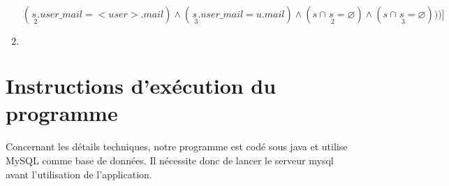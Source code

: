 \documentclass[a4paper,10pt]{article}
\begin{document}
\begin{enumerate}
		\begin{equation}
		( \underset{\ \ 2}{s}.user\_mail = <user>.mail ) \wedge ( \underset{\ \ 3}{s}.user\_mail = u.mail ) \wedge ( s \cap \underset{\ \ 2}{s} = \varnothing ) \wedge ( s \cap \underset{\ \ 3}{s} = \varnothing )))]
		\end{equation} 
	    \item
	         \begin{equation}
		[u.* | \ User(u) \ \wedge \forall \underset{\ \ 2}{u} (User(\underset{\ \ 2}{u}) \rightarrow ( \exists \underset{\ \ 1}{p} \underset{\ \ 2}{p} \underset{\ \ 3}{p} \underset{\ \ 4}{p} \underset{\ \ 5}{p} \underset{\ \ 6}{p} (Proposition(\underset{\ \ 1}{p}) \wedge Proposition(\underset{\ \ 2}{p})  \wedge Proposition(\underset{\ \ 3}{p})
		\end{equation}
		\begin{equation}
                  \wedge Proposition(\underset{\ \ 4}{p}) \wedge Proposition(\underset{\ \ 5}{p}) \wedge Proposition(\underset{\ \ 6}{p}) \wedge \underset{\ \ 1}{p}.stream\_url = <user>.personal\_stream\_url 
		\end{equation}
		\begin{equation}
                   \wedge \underset{\ \ 2}{p}.stream\_url = <user>.personal\_stream\_url \wedge \underset{\ \ 3}{p}.stream\_url = <user>.personal\_stream\_url
		\end{equation}
		\begin{equation}
                   \wedge \underset{\ \ 4}{p}.stream\_url = u.personal\_stream\_url \wedge \underset{\ \ 5}{p}.stream\_url = u.personal\_stream\_url 
		\end{equation}
		\begin{equation}
                   \wedge \underset{\ \ 6}{p}.stream\_url = u.personal\_stream\_url \wedge \underset{\ \ 1}{p}.publication\_url =  \underset{\ \ 4}{p}.publication\_url 
		\end{equation}
		\begin{equation}
		\wedge \underset{\ \ 2}{p}.publication\_url =  \underset{\ \ 5}{p}.publication\_url \wedge \underset{\ \ 3}{p}.publication\_url =  \underset{\ \ 6}{p}.publication\_url 
		\end{equation}
		\begin{equation}
		\wedge \underset{\ \ 4}{p}.stream\_url  \ !=  <user>.personal\_stream\_url \wedge \underset{\ \ 5}{p}.stream\_url  \ !=  <user>.personal\_stream\_url
		\end{equation}
		\begin{equation}
		\wedge \underset{\ \ 6}{p}.stream\_url  \ !=  <user>.personal\_stream\_url)))]
		\end{equation}
	\end{enumerate}

\section{Instructions d'exécution du programme}

Concernant les détails techniques, notre programme est codé sous java et utilise MySQL comme base de données. Il nécessite donc de lancer le serveur mysql avant l'utilisation de l'application.
\end{document}

